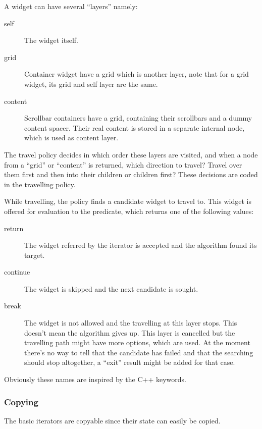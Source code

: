 A widget can have several ``layers'' namely:

\begin{description}
\item[self] The widget itself.
\item[grid] Container widget have a grid which is another layer, note that for a
	grid widget, its grid and self layer are the same.
\item[content] Scrollbar containers have a grid, containing their scrollbars and
	a dummy content spacer. Their real content is stored in a separate internal
	node, which is used as content layer.
\end{description}

The travel policy decides in which order these layers are visited, and when a
node from a ``grid'' or ``content'' is returned, which direction to travel?
Travel over them first and then into their children or children first? These
decisions are coded in the travelling policy.

While travelling, the policy finds a candidate widget to travel to. This widget is
offered for evaluation to the predicate, which returns one of the following
values:

\begin{description}
\item[return] The widget referred by the iterator is accepted and the algorithm
	found its target.
\item[continue] The widget is skipped and the next candidate is sought.
\item[break] The widget is not allowed and the travelling at this layer stops.
	This doesn't mean the algorithm gives up. This layer is cancelled but the
	travelling path might have more options, which are used. At the moment there's
	no way to tell that the candidate has failed and that the searching should stop
	altogether, a ``exit'' result might be added for that case.
\end{description}

Obviously these names are inspired by the C++ keywords.

\subsubsection{Copying}

The basic iterators are copyable since their state can easily be copied.

\paragraph{}

